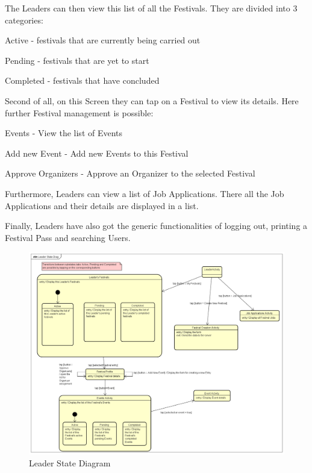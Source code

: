 			The Leaders can then view this list of all the Festivals. They are divided into 3 categories:
			\begin{packed_enum}
				\item Active - festivals that are currently being carried out
				\item Pending - festivals that are yet to start
				\item Completed - festivals that have concluded
			\end{packed_enum}
		
			Second of all, on this Screen they can tap on a Festival to view its details. Here further Festival management is possible:
			\begin{packed_enum}
				\item Events - View the list of Events
				\item Add new Event - Add new Events to this Festival
				\item Approve Organizers - Approve an Organizer to the selected Festival
			\end{packed_enum}
		
			Furthermore, Leaders can view a list of Job Applications. There all the Job Applications and their details are displayed in a list.
			
			Finally, Leaders have also got the generic functionalities of logging out, printing a Festival Pass and searching Users.
			
			 \begin{figure}[H]
			 	\includegraphics[width=\linewidth]{diagrams/Leader State Diag.png}
			 	\caption{Leader State Diagram}
			 	\label{fig:leader_state_diag}
			 \end{figure}
			\eject
			  
